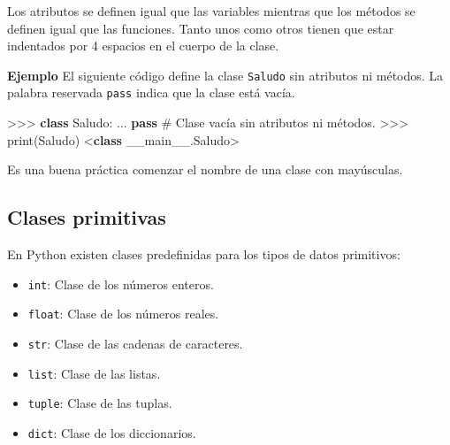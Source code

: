 \documentclass[
  spanish,
  a4paper,
]{scrreport}
\newenvironment{Shaded}{\begin{snugshade}}{\end{snugshade}}
\newcommand{\BuiltInTok}[1]{\textcolor[rgb]{0.00,0.23,0.31}{#1}}
\newcommand{\CommentTok}[1]{\textcolor[rgb]{0.37,0.37,0.37}{#1}}
\newcommand{\ControlFlowTok}[1]{\textcolor[rgb]{0.00,0.23,0.31}{\textbf{#1}}}
\newcommand{\KeywordTok}[1]{\textcolor[rgb]{0.00,0.23,0.31}{\textbf{#1}}}
\newcommand{\NormalTok}[1]{\textcolor[rgb]{0.00,0.23,0.31}{#1}}
\newcommand{\OperatorTok}[1]{\textcolor[rgb]{0.37,0.37,0.37}{#1}}
\newcommand{\StringTok}[1]{\textcolor[rgb]{0.13,0.47,0.30}{#1}}
\providecommand{\tightlist}{%
  \setlength{\itemsep}{0pt}\setlength{\parskip}{0pt}}
\begin{document}
Los atributos se definen igual que las variables mientras que los
métodos se definen igual que las funciones. Tanto unos como otros tienen
que estar indentados por 4 espacios en el cuerpo de la clase.

\textbf{Ejemplo} El siguiente código define la clase \texttt{Saludo} sin
atributos ni métodos. La palabra reservada \texttt{pass} indica que la
clase está vacía.

\begin{Shaded}
\begin{Highlighting}[]
\OperatorTok{\textgreater{}\textgreater{}\textgreater{}} \KeywordTok{class}\NormalTok{ Saludo:}
\NormalTok{...     }\ControlFlowTok{pass}        \CommentTok{\# Clase vacía sin atributos ni métodos.}
\OperatorTok{\textgreater{}\textgreater{}\textgreater{}} \BuiltInTok{print}\NormalTok{(Saludo)}
\OperatorTok{\textless{}}\KeywordTok{class} \StringTok{\textquotesingle{}\_\_main\_\_.Saludo\textquotesingle{}}\OperatorTok{\textgreater{}}
\end{Highlighting}
\end{Shaded}

\begin{tcolorbox}[enhanced jigsaw, arc=.35mm, bottomrule=.15mm, bottomtitle=1mm, breakable, colback=white, colbacktitle=quarto-callout-warning-color!10!white, colframe=quarto-callout-warning-color-frame, coltitle=black, left=2mm, leftrule=.75mm, opacityback=0, opacitybacktitle=0.6, rightrule=.15mm, title=\textcolor{quarto-callout-warning-color}{\faExclamationTriangle}\hspace{0.5em}{Advertencia}, titlerule=0mm, toprule=.15mm, toptitle=1mm]

Es una buena práctica comenzar el nombre de una clase con mayúsculas.

\end{tcolorbox}

\subsection{Clases primitivas}\label{clases-primitivas}

En Python existen clases predefinidas para los tipos de datos
primitivos:

\begin{itemize}
\tightlist
\item
  \texttt{int}: Clase de los números enteros.
\item
  \texttt{float}: Clase de los números reales.
\item
  \texttt{str}: Clase de las cadenas de caracteres.
\item
  \texttt{list}: Clase de las listas.
\item
  \texttt{tuple}: Clase de las tuplas.
\item
  \texttt{dict}: Clase de los diccionarios.
\end{itemize}
\end{document}
